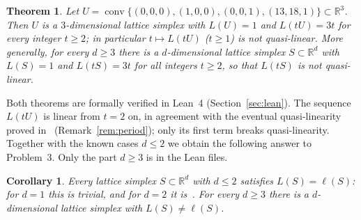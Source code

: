 \documentclass[11pt]{article}
\newtheorem{theorem}{Theorem}
\newtheorem{corollary}{Corollary}
\theoremstyle{definition}
\theoremstyle{remark}
\newcommand{\R}{\mathbb R}
\DeclareMathOperator{\conv}{conv}
\begin{document}
\begin{theorem}\label{thm:dil}
Let $U=\conv\{(0,0,0),(1,0,0),(0,0,1),(13,18,1)\}\subset\R^3$. Then $U$ is a
$3$-dimensional lattice simplex with $L(U)=1$ and $L(tU)=3t$ for every integer
$t\ge2$; in particular $t\mapsto L(tU)$ ($t\ge1$) is not quasi-linear. More
generally, for every $d\ge3$ there is a $d$-dimensional lattice simplex
$S\subset\R^d$ with $L(S)=1$ and $L(tS)=3t$ for all integers $t\ge2$, so that
$L(tS)$ is not quasi-linear.
\end{theorem}

Both theorems are formally verified in Lean~4 (Section~\ref{sec:lean}). The
sequence $L(tU)$ is linear from $t=2$ on, in agreement with the eventual
quasi-linearity proved in~\cite{ss} (Remark~\ref{rem:period}); only its first
term breaks quasi-linearity. Together with the known cases $d\le2$ we obtain
the following answer to Problem~3. Only the part $d\ge3$ is in the Lean files.

\begin{corollary}\label{cor:p3}
Every lattice simplex $S\subset\R^d$ with $d\le2$ satisfies $L(S)=\ell(S)$:
for $d=1$ this is trivial, and for $d=2$ it is~\cite[Corollary~3.2]{ss}. For
every $d\ge3$ there is a $d$-dimensional lattice simplex with $L(S)\neq\ell(S)$.
\end{corollary}
\end{document}
